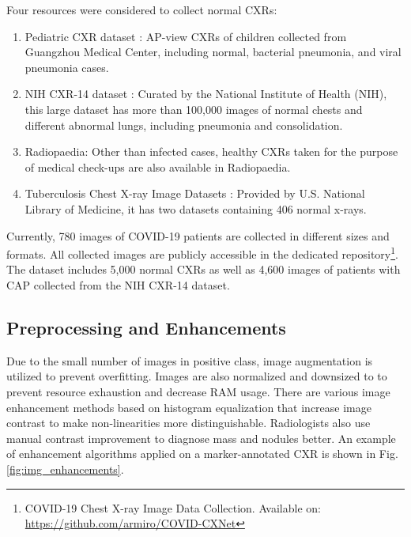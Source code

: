 \documentclass{article}
\newcommand\numOfImages{780}
\begin{document}
Four resources were considered to collect normal CXRs:
\begin{enumerate}
    \item Pediatric CXR dataset \cite{kermany2018identifying}: AP-view CXRs of children collected from Guangzhou Medical Center, including normal, bacterial pneumonia, and viral pneumonia cases.
    \item NIH CXR-14 dataset \cite{wang2017chestx}: Curated by the National Institute of Health (NIH), this large dataset has more than 100,000 images of normal chests and different abnormal lungs, including pneumonia and consolidation.
    \item Radiopaedia: Other than infected cases, healthy CXRs taken for the purpose of medical check-ups are also available in Radiopaedia.
    \item Tuberculosis Chest X-ray Image Datasets \cite{jaeger2014two}: Provided by U.S. National Library of Medicine, it has two datasets containing 406 normal x-rays.
\end{enumerate}

Currently, \numOfImages{} images of COVID-19 patients are collected in different sizes and formats. All collected images are publicly accessible in the dedicated repository\footnote{COVID-19 Chest X-ray Image Data Collection. Available on: \href{https://github.com/armiro/COVID-CXNet}{https://github.com/armiro/COVID-CXNet}}. The dataset includes 5,000 normal CXRs as well as 4,600 images of patients with CAP collected from the NIH CXR-14 dataset. 







\subsection{Preprocessing and Enhancements}

Due to the small number of images in positive class, image augmentation is utilized to prevent overfitting. Images are also normalized and downsized to  to prevent resource exhaustion and decrease RAM usage. There are various image enhancement methods based on histogram equalization that increase image contrast to make non-linearities more distinguishable. Radiologists also use manual contrast improvement to diagnose mass and nodules better. An example of enhancement algorithms applied on a marker-annotated CXR is shown in Fig. \ref{fig:img_enhancements}.
\end{document}
